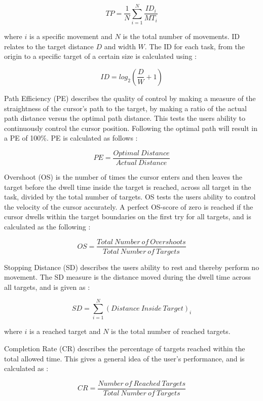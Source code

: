 \begin{equation} \label{eq:TP}
TP=\frac{1}{N}\sum\limits_{i=1}^{N} \frac{ID_i}{MT_i} 
\end{equation}

where $i$ is a specific movement and $N$ is the total number of movements. ID relates to the target distance $D$ and width $W$. The ID for each task, from the origin to a specific target of a certain size is calculated using \cite{Scheme2013,Fitts1954}:

\begin{equation} \label{eq:ID}
ID=log_2(\frac{D}{W}+1)
\end{equation}

Path Efficiency (PE) describes the quality of control by making a measure of the straightness of the cursor's path to the target, by making a ratio of the actual path distance versus the optimal path distance. This tests the users ability to continuously control the cursor position. Following the optimal path will result in a PE of 100\%. PE is calculated as follows \cite{Scheme2013, Poulton2013}:       

\begin{equation} \label{eq:PE}
PE = \frac{Optimal ~ Distance}{Actual ~ Distance}
\end{equation}		 

Overshoot (OS) is the number of times the cursor enters and then leaves the target before the dwell time inside the target is reached, across all target in the task, divided by the total number of targets. OS tests the users ability to control the velocity of the cursor accurately. A perfect OS-score of zero is reached if the cursor dwells within the target boundaries on the first try for all targets, and is calculated as the following \cite{Scheme2013, Poulton2013}:

\begin{equation} \label{eq:OS}
OS = \frac{Total ~ Number ~ of ~ Overshoots}{Total ~ Number ~ of ~ Targets}
\end{equation}

Stopping Distance (SD) describes the users ability to rest and thereby perform no movement. The SD measure is the distance moved during the dwell time across all targets, and is given as \cite{Scheme2013}:

\begin{equation} \label{eq:SD}
SD = \sum\limits_{i=1}^{N} (Distance ~ Inside ~ Target)_i
\end{equation}

where $i$ is a reached target and $N$ is the total number of reached targets.

Completion Rate (CR) describes the percentage of targets reached within the total allowed time. This gives a general idea of the user's performance, and is calculated as \cite{Scheme2013,Simon2011}: 

\begin{equation} \label{eq:CR}
CR = \frac{Number ~ of ~ Reached ~ Targets}{Total ~ Number ~ of ~ Targets}
\end{equation}